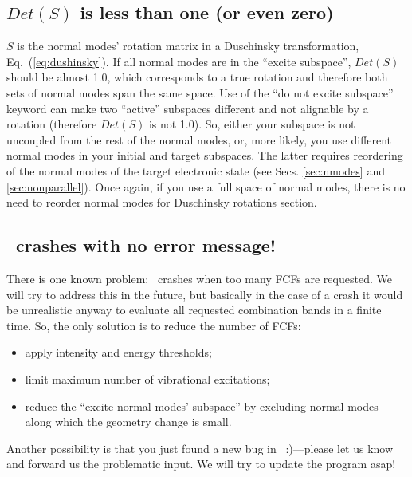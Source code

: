 \documentclass[11pt]{article}
\begin{document}
\subsection{$Det(S)$ is less than one (or even zero)}
\label{sec:detS}

$S$ is the normal modes' rotation matrix in a Duschinsky transformation, Eq.~(\ref{eq:dushinsky}).
If all normal modes are in the ``excite subspace'', $Det(S)$ should be almost 1.0, 
which corresponds to a true rotation and therefore both sets of normal modes span the same space.  Use of the ``do not excite subspace'' keyword can make two ``active''
subspaces different and not alignable by a rotation (therefore $Det(S)$ is not 1.0).
So, either your subspace is not uncoupled from the rest of the normal modes, or, 
more likely, you use different normal modes in your initial and target subspaces.
The latter requires reordering of the normal modes of the target electronic state
(see Secs. \ref{sec:nmodes} and \ref{sec:nonparallel}).
Once again, if you use a full space of normal modes, there is no need to reorder normal modes for Duschinsky rotations section.

\subsection{\ezFCF\ crashes with no error message!}
\label{sec:crash}

There is one known problem: \ezFCF\ crashes when too many FCFs are requested.
We will try to address this in the future, 
but basically in the case of a crash it would be unrealistic anyway to evaluate all requested combination bands 
in a finite time.
So, the only solution is to reduce the number of FCFs:
\begin{itemize}
\item apply intensity and energy thresholds;  
\item limit maximum number of vibrational excitations; 
\item reduce the ``excite normal modes' subspace'' by excluding normal modes along which the geometry change is small.
\end{itemize}

Another possibility is that you just found a new bug in \ezFCF\ :)---please let us know and forward us
the problematic input. We will try to update the program asap!
\end{document}
